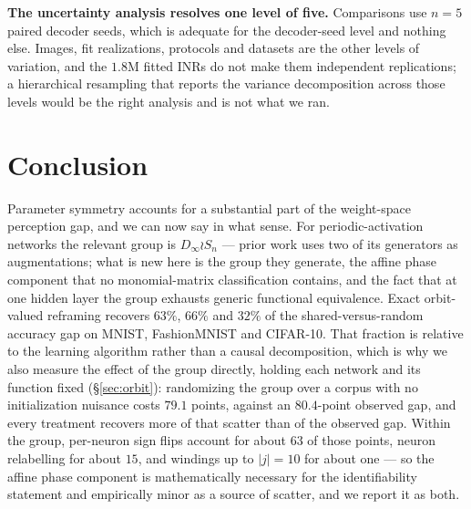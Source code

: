 \documentclass[10pt,letterpaper]{article}
\theoremstyle{definition}
\newcommand{\Dinf}{D_\infty}
\begin{document}
\textbf{The uncertainty analysis resolves one level of five.} Comparisons use $n=5$ paired decoder
seeds, which is adequate for the decoder-seed level and nothing else. Images, fit realizations,
protocols and datasets are the other levels of variation, and the $1.8$M fitted INRs do not make
them independent replications; a hierarchical resampling that reports the variance decomposition
across those levels would be the right analysis and is not what we ran.

\section{Conclusion}

Parameter symmetry accounts for a substantial part of the weight-space perception gap, and we can
now say in what sense. For periodic-activation networks the relevant group is $\Dinf\wr S_n$ ---
prior work uses two of its generators as augmentations; what is new here is the group they generate,
the affine phase component that no monomial-matrix classification contains, and the fact that at one
hidden layer the group exhausts generic functional equivalence. Exact orbit-valued reframing
recovers $63\%$, $66\%$ and $32\%$ of the shared-versus-random accuracy gap on MNIST, FashionMNIST
and CIFAR-10. That fraction is relative to the learning algorithm rather than a causal
decomposition, which is why we also measure the effect of the group directly, holding each network
and its function fixed (\S\ref{sec:orbit}): randomizing the group over a corpus with no
initialization nuisance costs $79.1$ points, against an $80.4$-point observed gap, and every
treatment recovers more of that scatter than of the observed gap. Within the group, per-neuron sign
flips account for about $63$ of those points, neuron relabelling for about $15$, and windings up to
$|j|=10$ for about one --- so the affine phase component is mathematically necessary for the
identifiability statement and empirically minor as a source of scatter, and we report it as both.
\end{document}

